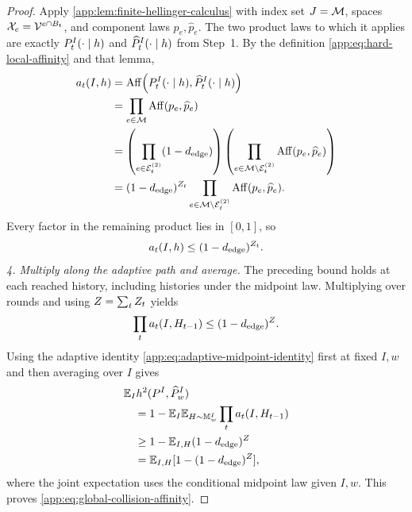 \begin{proof}
Apply \cref{app:lem:finite-hellinger-calculus} with index set
\(J=\HiddenMatching\), spaces \(\mathcal X_e=\Vocab^{e\cap B_t}\),
and component laws \(p_e,\widehat p_e\).
The two product laws to which it applies are exactly
\(\HardExactBatchLaw{t}{I}(\cdot\mid h)\) and
\(\HardProductBatchLaw{t}{I}(\cdot\mid h)\) from Step~1.
By the definition \eqref{app:eq:hard-local-affinity} and that lemma,
\begin{align*}
 \HardLocalAffinity{t}{I,h}
 &=\HellingerAffinity\!\left(
      \HardExactBatchLaw{t}{I}(\cdot\mid h),
      \HardProductBatchLaw{t}{I}(\cdot\mid h)\right)\\
 &=\prod_{e\in\HiddenMatching}\HellingerAffinity(p_e,\widehat p_e)\\
 &=\left(\prod_{e\in\mathcal E_t^{(2)}}(1-\HardEdgeDistance)\right)
   \left(\prod_{e\in\HiddenMatching\setminus\mathcal E_t^{(2)}}
                \HellingerAffinity(p_e,\widehat p_e)\right)\\
 &=(1-\HardEdgeDistance)^{\CollisionCount{t}}
   \prod_{e\in\HiddenMatching\setminus\mathcal E_t^{(2)}}
                \HellingerAffinity(p_e,\widehat p_e).
\end{align*}
Every factor in the remaining product lies in \([0,1]\), so
\begin{equation}
 \HardLocalAffinity{t}{I,h}
 \le(1-\HardEdgeDistance)^{\CollisionCount{t}}.
 \label{app:eq:local-collision-affinity}
\end{equation}
\emph{4. Multiply along the adaptive path and average.}
The preceding bound holds at each reached history, including histories
under the midpoint law. Multiplying over rounds and using
\(\TotalCollisions=\sum_t\CollisionCount{t}\) yields
\[
 \prod_t\HardLocalAffinity{t}{I,H_{t-1}}
 \le(1-\HardEdgeDistance)^{\TotalCollisions}.
\]
Using the adaptive identity \eqref{app:eq:adaptive-midpoint-identity}
first at fixed \(I,w\) and then averaging over \(I\) gives
\begin{align*}
 &\mathbb E_I\sqHellinger(\HardTargetLaw{I},\HardOutputLaw{I}{w})\\
 &\quad=1-\mathbb E_I
    \mathbb E_{H\sim\HardMidpointLaw{I}{w}}
       \prod_t\HardLocalAffinity{t}{I,H_{t-1}}\\
 &\quad\ge1-\mathbb E_{I,H}(1-\HardEdgeDistance)^{\TotalCollisions}\\
 &\quad=\mathbb E_{I,H}
       [1-(1-\HardEdgeDistance)^{\TotalCollisions}],
\end{align*}
where the joint expectation uses the conditional midpoint law given \(I,w\).
This proves \eqref{app:eq:global-collision-affinity}.
\end{proof}
